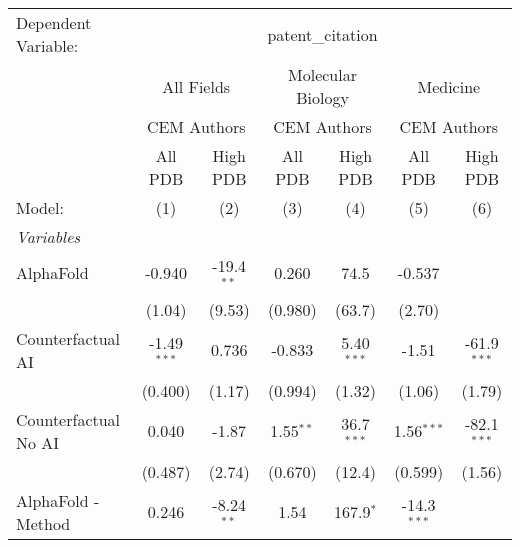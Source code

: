 \begingroup
\centering
\begin{tabular}{lcccccc}
   \tabularnewline \midrule \midrule
   Dependent Variable: & \multicolumn{6}{c}{patent\_citation}\\
 & \multicolumn{2}{c}{All Fields} & \multicolumn{2}{c}{Molecular Biology} & \multicolumn{2}{c}{Medicine} \\
\cmidrule(lr){2-3} \cmidrule(lr){4-5} \cmidrule(lr){6-7}
 & \multicolumn{2}{c}{CEM Authors} & \multicolumn{2}{c}{CEM Authors} & \multicolumn{2}{c}{CEM Authors} \\
\cmidrule(lr){2-3} \cmidrule(lr){4-5} \cmidrule(lr){6-7}
 & \multicolumn{1}{c}{All PDB} & \multicolumn{1}{c}{High PDB} & \multicolumn{1}{c}{All PDB} & \multicolumn{1}{c}{High PDB} & \multicolumn{1}{c}{All PDB} & \multicolumn{1}{c}{High PDB} \\
\cmidrule(lr){2-2} \cmidrule(lr){3-3} \cmidrule(lr){4-4} \cmidrule(lr){5-5} \cmidrule(lr){6-6} \cmidrule(lr){7-7}
   Model:                                                     & (1)           & (2)           & (3)           & (4)            & (5)           & (6)\\  
   \midrule
   \emph{Variables}\\
   AlphaFold                                                  & -0.940        & -19.4$^{**}$  & 0.260         & 74.5           & -0.537        &   \\   
                                                              & (1.04)        & (9.53)        & (0.980)       & (63.7)         & (2.70)        &   \\   
   Counterfactual AI                                          & -1.49$^{***}$ & 0.736         & -0.833        & 5.40$^{***}$   & -1.51         & -61.9$^{***}$\\   
                                                              & (0.400)       & (1.17)        & (0.994)       & (1.32)         & (1.06)        & (1.79)\\   
   Counterfactual No AI                                       & 0.040         & -1.87         & 1.55$^{**}$   & 36.7$^{***}$   & 1.56$^{***}$  & -82.1$^{***}$\\   
                                                              & (0.487)       & (2.74)        & (0.670)       & (12.4)         & (0.599)       & (1.56)\\   
   AlphaFold - Method                                         & 0.246         & -8.24$^{**}$  & 1.54          & 167.9$^{*}$    & -14.3$^{***}$ &   \\   

\end{tabular}
